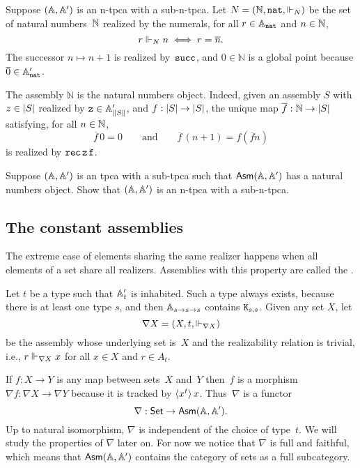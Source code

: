 Suppose $(\AA, \subAA)$ is an n-tpca with a sub-n-tpca. Let $N = (\NN, \ttnat, {\rz[N]})$ be the set of natural numbers~$\NN$ realized by the numerals, for all $r \in \Atyp{\ttnat}$ and $n \in \NN$,
%
\begin{equation*}
  r \rz[N] n \iff
  r = \overline{n}.
\end{equation*}
%
The successor $n \mapsto n + 1$ is realized by~$\combSucc$, and $0 \in \mathbb{N}$ is a global point because $\numeral{0} \in \subAtyp{\ttnat}$.

The assembly $\mathbb{N}$ is the natural numbers object. Indeed, given an assembly $S$ with $z \in \S{S}$ realized by $\mathtt{z} \in \subAtyp{\T{S}}$, and $f : \S{S} \to \S{S}$, the unique map $\overline{f} : \mathbb{N} \to \S{S}$ satisfying, for all $n \in \NN$,
%
\begin{equation*}
  \overline{f} \, 0 = 0
  \qquad\text{and}\qquad
  \overline{f} \, (n + 1) = f (\overline{f} n)
\end{equation*}
%
is realized by $\combRec \, \mathtt{z} \, \mathtt{f}$.

\begin{exercise}
  Suppose $(\AA, \subAA)$ is an tpca with a sub-tpca such that $\AsmA$ has a natural numbers object. Show that $(\AA, \subAA)$ is an n-tpca with a sub-n-tpca.
\end{exercise}


\subsection{The constant assemblies}
\label{sec:nabla}

The extreme case of elements sharing the same realizer happens when
all elements of a set share all realizers. Assemblies with this
property are called the .

Let $t$ be a type such that $\subAtyp{t}$ is inhabited. Such a type
always exists, because there is at least one type $s$, and then
$\Atyp{s \to s \to s}$ contains $\combK_{s,s}$. Given any set $X$, let
%
\begin{equation*}
  \nabla X = (X, t, {\rz[\nabla X]})
\end{equation*}
%
be the assembly whose underlying set is~$X$ and the realizability relation is trivial, i.e., $r \rz[\nabla X] x$ for all $x \in X$ and $r \in A_t$.

If $f : X \to Y$ is any map between sets~$X$ and~$Y$ then~$f$ is a morphism $\nabla f : \nabla X \to \nabla Y$ because it is tracked by $\tpcalam{x}{t}{x}$. Thus~$\nabla$ is a functor
%
\begin{equation*}
  \nabla : \Set \to \AsmA.
\end{equation*}
%
Up to natural isomorphism, $\nabla$ is independent of the choice of
type~$t$. We will study the properties of $\nabla$ later on. For now
we notice that $\nabla$ is full and faithful, which means that
$\AsmA$ contains the category of sets as a full
subcategory.

